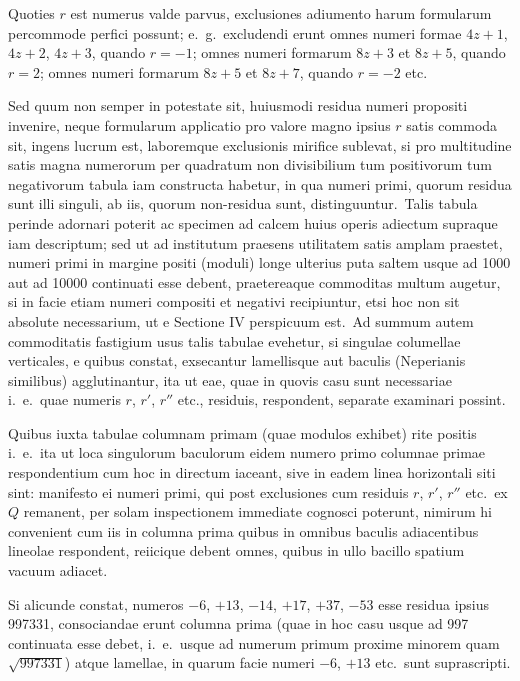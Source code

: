\documentclass[12pt,a4paper]{article}
\theoremstyle{plain}
\theoremstyle{definition}
\theoremstyle{remark}
\begin{document}
Quoties $r$ est numerus valde parvus, exclusiones adiumento harum
formularum percommode perfici possunt; e.\ g.\ excludendi erunt omnes
numeri formae $4z+1$, $4z+2$, $4z+3$, quando $r=-1$; omnes numeri
formarum $8z+3$ et $8z+5$, quando $r=2$; omnes numeri formarum
$8z+5$ et $8z+7$, quando $r=-2$ etc.

Sed quum non semper in potestate sit, huiusmodi residua numeri
propositi invenire, neque formularum applicatio pro valore magno ipsius $r$
satis commoda sit, ingens lucrum est, laboremque exclusionis mirifice
sublevat, si pro multitudine satis magna numerorum per quadratum non
divisibilium tum positivorum tum negativorum tabula iam constructa habetur,
in qua numeri primi, quorum residua sunt illi singuli, ab iis, quorum
non-residua sunt, distinguuntur.\ Talis tabula perinde adornari poterit ac
specimen ad calcem huius operis adiectum supraque iam descriptum; sed ut
ad institutum praesens utilitatem satis amplam praestet, numeri primi in
margine positi (moduli) longe ulterius puta saltem usque ad 1000 aut ad
10000 continuati esse debent, praetereaque commoditas multum augetur, si
in facie etiam numeri compositi et negativi recipiuntur, etsi hoc non sit
absolute necessarium, ut e Sectione IV perspicuum est.\ Ad summum autem
commoditatis fastigium usus talis tabulae evehetur, si singulae columellae
verticales, e quibus constat, exsecantur lamellisque aut baculis (Neperianis
similibus) agglutinantur, ita ut eae, quae in quovis casu sunt necessariae
i.\ e.\ quae numeris $r$, $r'$, $r''$ etc., residuis, respondent, separate examinari
possint.

Quibus iuxta tabulae columnam primam (quae modulos exhibet) rite
positis i.\ e.\ ita ut loca singulorum baculorum eidem numero primo columnae
primae respondentium cum hoc in directum iaceant, sive in eadem linea
horizontali siti sint: manifesto ei numeri primi, qui post exclusiones cum
residuis $r$, $r'$, $r''$ etc.\ ex $Q$ remanent, per solam inspectionem immediate
cognosci poterunt, nimirum hi convenient cum iis in columna prima quibus
in omnibus baculis adiacentibus lineolae respondent, reiicique debent omnes,
quibus in ullo bacillo spatium vacuum adiacet.

Si alicunde constat, numeros $-6$, $+13$, $-14$, $+17$, $+37$, $-53$
esse residua ipsius 997331, consociandae erunt columna prima (quae in hoc
casu usque ad 997 continuata esse debet, i.\ e.\ usque ad numerum primum
proxime minorem quam $\sqrt{997331}$) atque lamellae, in quarum facie numeri
$-6$, $+13$ etc.\ sunt suprascripti.
\end{document}

